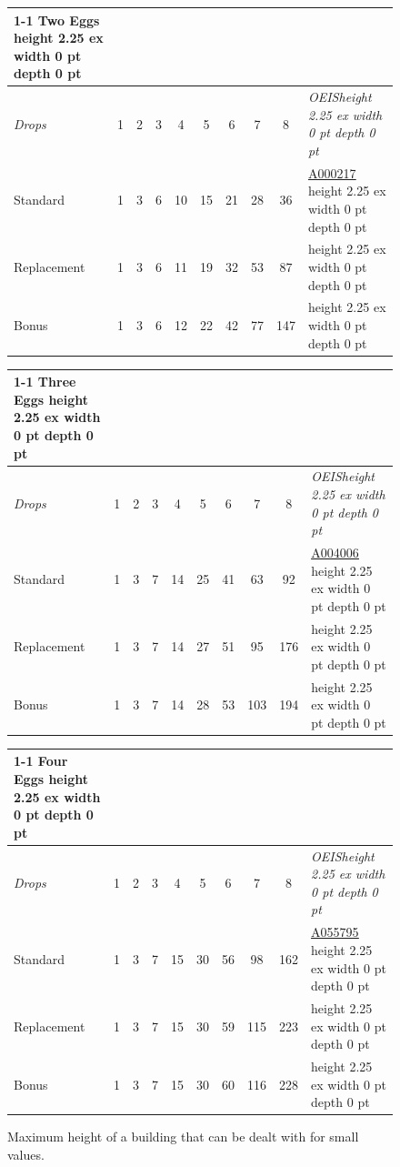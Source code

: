 \documentclass[12pt]{amsart}
\newcommand{\seqnum}[1]{\href{https://oeis.org/#1}{\rm \underline{#1}}}
\theoremstyle{definition}
\theoremstyle{theorem}
\begin{document}
\begin{figure}[htp] 
\begin{center}
	
\begin{tabular}{| l | c | c | c | c | c | c | c | c | l |}
\cline{1-1}
{\bf Two Eggs}  \vrule height 2.25 ex width 0 pt depth 0 pt \\[0.25ex]
\hline
\it{Drops} & 1 & 2 & 3 & 4 & 5 & 6 & 7 & 8  & \it{OEIS}\vrule height 2.25 ex width 0 pt depth 0 pt \\[0.25ex]
\hline
Standard       & 1 & 3 & 6 & 10 & 15 & 21 & 28 & 36  & \seqnum{A000217}
\vrule height 2.25 ex width 0 pt depth 0 pt \\[0.25ex]
\hline
Replacement & 1 & 3 & 6 & 11 & 19 & 32 & 53 & 87  &\vrule height 2.25 ex width 0 pt depth 0 pt \\[0.25ex]
\hline
Bonus            & 1 & 3 & 6 & 12 & 22 & 42 & 77 & 147  &\vrule height 2.25 ex width 0 pt depth 0 pt \\[0.25ex]
\hline
\end{tabular}

\bigskip
\begin{tabular}{| l | c | c | c | c | c | c | c | c | l |}
\cline{1-1}
{\bf Three Eggs}  \vrule height 2.25 ex width 0 pt depth 0 pt \\[0.25ex]
\hline
\it{Drops} & 1 & 2 & 3 & 4 & 5 & 6 & 7 & 8  & \it{OEIS}\vrule height 2.25 ex width 0 pt depth 0 pt \\[0.25ex]
\hline
Standard       & 1 & 3 & 7 & 14 & 25 & 41 & 63 & 92   &  \seqnum{A004006} \vrule height 2.25 ex width 0 pt depth 0 pt \\[0.25ex]
\hline
Replacement & 1 & 3 & 7 & 14 & 27 & 51 & 95 & 176 & \vrule height 2.25 ex width 0 pt depth 0 pt \\[0.25ex]
\hline
Bonus            & 1 & 3 & 7 & 14 & 28 & 53 & 103 & 194  &\vrule height 2.25 ex width 0 pt depth 0 pt \\[0.25ex]
\hline
\end{tabular}

\bigskip
\begin{tabular}{| l | c | c | c | c | c | c | c | c | l |}
\cline{1-1}
{\bf Four Eggs}  \vrule height 2.25 ex width 0 pt depth 0 pt \\[0.25ex]
\hline
\it{Drops} & 1 & 2 & 3 & 4 & 5 & 6 & 7 & 8  & \it{OEIS}\vrule height 2.25 ex width 0 pt depth 0 pt \\[0.25ex]
\hline
Standard       & 1 & 3 & 7 & 15 & 30 & 56 & 98 & 162 & \seqnum{A055795}  \vrule height 2.25 ex width 0 pt depth 0 pt \\[0.25ex]
\hline
Replacement & 1 & 3 & 7 & 15 & 30 & 59 & 115 & 223 & \vrule height 2.25 ex width 0 pt depth 0 pt \\[0.25ex]
\hline
Bonus            & 1 & 3 & 7 & 15 & 30 & 60 & 116 & 228  &\vrule height 2.25 ex width 0 pt depth 0 pt \\[0.25ex]
\hline
\end{tabular}
\end{center}
\caption{Maximum height of a building that can be dealt with for small values.}\label{all.table}
\end{figure}
\end{document}

